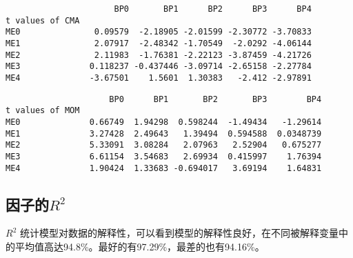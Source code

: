 \documentclass[11pt]{article}
\begin{document}
    \begin{verbatim}
                      BP0       BP1      BP2      BP3      BP4
t values of CMA                                               
ME0               0.09579  -2.18905 -2.01599 -2.30772 -3.70833
ME1               2.07917  -2.48342 -1.70549  -2.0292 -4.06144
ME2               2.11983  -1.76381 -2.22123 -3.87459 -4.21726
ME3              0.118237 -0.437446 -3.09714 -2.65158 -2.27784
ME4              -3.67501    1.5601  1.30383   -2.412 -2.97891
    \end{verbatim}

    
    
    \begin{verbatim}
                     BP0      BP1       BP2       BP3        BP4
t values of MOM                                                 
ME0              0.66749  1.94298  0.598244  -1.49434   -1.29614
ME1              3.27428  2.49643   1.39494  0.594588  0.0348739
ME2              5.33091  3.08284   2.07963   2.52904   0.675277
ME3              6.61154  3.54683   2.69934  0.415997    1.76394
ME4              1.90424  1.33683 -0.694017   3.69194    1.64831
    \end{verbatim}

    
    \subsection{\texorpdfstring{因子的\(R^2\)}{因子的R\^{}2}}\label{ux56e0ux5b50ux7684r2}

\(R^2\)
统计模型对数据的解释性，可以看到模型的解释性良好，在不同被解释变量中的平均值高达94.8\%。最好的有97.29\%，最差的也有94.16\%。
\end{document}
